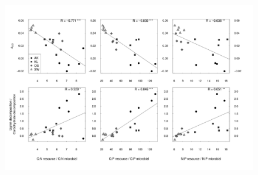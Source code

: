 \documentclass[10pt]{article}
\begin{document}
\begin{flushleft}
\newpage
\begin{figure}[h!]
\vspace*{2mm}
\begin{center}
\includegraphics{ligpaper-graphcorr}
\end{center}
\end{figure}


\end{flushleft}
\end{document}
